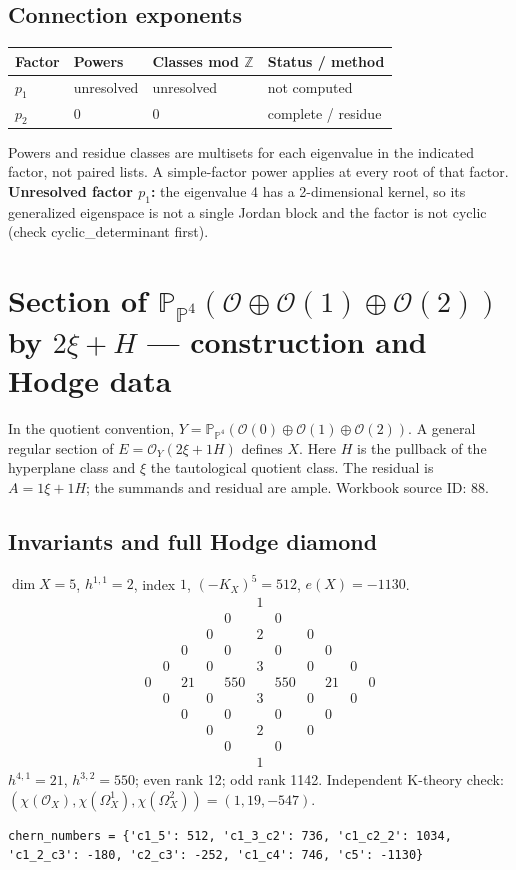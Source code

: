\documentclass[10pt,a4paper]{article}
\begin{document}
\subsection*{Connection exponents}
\begin{center}\begin{tabular}{llll}\toprule Factor & Powers & Classes mod $\mathbb Z$ & Status / method\\\midrule
$p_{1}$ & unresolved & unresolved & not computed\\
$p_{2}$ & $0$ & $0$ & complete / residue\\
\bottomrule\end{tabular}\end{center}
Powers and residue classes are multisets for each eigenvalue in the indicated factor, not paired lists. A simple-factor power applies at every root of that factor.
\textbf{Unresolved factor $p_{1}$:} the eigenvalue 4 has a 2-dimensional kernel, so its generalized eigenspace is not a single Jordan block and the factor is not cyclic (check cyclic\_determinant first).
\clearpage\section*{Section of $\mathbb P_{\mathbb P^{4}}(\mathcal O\oplus \mathcal O(1)\oplus \mathcal O(2))$ by $2\xi +H$ --- construction and Hodge data}\label{entry:PB5-088}
In the quotient convention, $Y=\mathbb P_{\mathbb P^{4}}(\mathcal O(0)\oplus\mathcal O(1)\oplus\mathcal O(2))$.
A general regular section of $E=\mathcal O_Y(2\xi+1H)$ defines $X$.
Here $H$ is the pullback of the hyperplane class and $\xi$ the tautological quotient class. The residual is $A=1\xi+1H$; the summands and residual are ample.
Workbook source ID: 88.
\subsection*{Invariants and full Hodge diamond}
$\dim X=5$, $h^{1,1}=2$, index $1$, $(-K_X)^5=512$, $e(X)=-1130$.
\[\begin{array}{ccccccccccc}&&&&&1&&&&&\\&&&&0&&0&&&&\\&&&0&&2&&0&&&\\&&0&&0&&0&&0&&\\&0&&0&&3&&0&&0&\\0&&21&&550&&550&&21&&0\\&0&&0&&3&&0&&0&\\&&0&&0&&0&&0&&\\&&&0&&2&&0&&&\\&&&&0&&0&&&&\\&&&&&1&&&&&\end{array}\]
$h^{4,1}=21$, $h^{3,2}=550$; even rank 12; odd rank 1142.
Independent K-theory check: $(\chi(\mathcal O_X),\chi(\Omega_X^1),\chi(\Omega_X^2))=(1, 19, -547)$.
\begin{lstlisting}
chern_numbers = {'c1_5': 512, 'c1_3_c2': 736, 'c1_c2_2': 1034, 'c1_2_c3': -180, 'c2_c3': -252, 'c1_c4': 746, 'c5': -1130}
\end{lstlisting}
\end{document}
